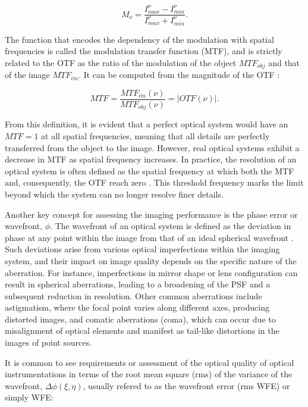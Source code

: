 \begin{equation}
  M _ {\nu} = \frac{I_{max} ^{\nu} - I_{min} ^{\nu}}{I_{max} ^{\nu} + I_{min} ^{\nu}}.
\end{equation}

The function that encodes the dependency of the modulation with spatial frequencies is called the modulation transfer function (MTF), and is strictly related to the OTF as the ratio of the modulation of the object $MTF_{obj}$ and that of the image $MTF_{im}$. It can be computed from the magnitude of the OTF \citep{OTF}:

\begin{equation}
  MTF = \frac{MTF_{im}(\nu)}{MTF_{obj}(\nu)} = | OTF(\nu) |.
\end{equation}

From this definition, it is evident that a perfect optical system would have an $MTF=1$ at all spatial frequencies, meaning that all details are perfectly transferred from the object to the image. However, real optical systems exhibit a decrease in MTF as spatial frequency increases. In practice, the resolution of an optical system is often defined as the spatial frequency at which both the MTF and, consequently, the OTF reach zero \citep{wfes}. This threshold frequency marks the limit beyond which the system can no longer resolve finer details. 

Another key concept for assessing the imaging performance is the phase error or wavefront, $\phi$. The wavefront of an optical system is defined as the deviation in phase at any point within the image from that of an ideal spherical wavefront \citep{WFE_def}. Such deviations arise from various optical imperfections within the imaging system, and their impact on image quality depends on the specific nature of the aberration. For instance, imperfections in mirror shape or lens configuration can result in spherical aberrations, leading to a broadening of the PSF and a subsequent reduction in resolution. Other common aberrations include astigmatism, where the focal point varies along different axes, producing distorted images, and comatic aberrations (coma), which can occur due to misalignment of optical elements and manifest as tail-like distortions in the images of point sources.

It is common to see requirements or assessment of the optical quality of optical instrumentations in terms of the root mean square (rms) of the variance of the wavefront, $\Delta \phi (\xi, \eta)$, usually refered to as the wavefront error (rms WFE) or simply WFE:

